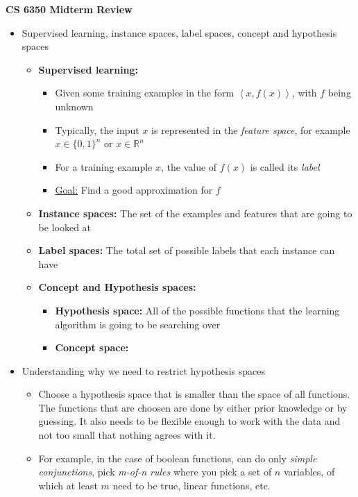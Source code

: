 \documentclass{article}
\begin{document}
\begin{center}
{\huge \bf CS 6350 Midterm Review}
\end{center}


\hspace{-1.5em}{\large \bf General Supervised Learning}
\begin{itemize}
\item Supervised learning, instance spaces, label spaces, concept and hypothesis spaces
	\begin{itemize}
	\item {\bf Supervised learning:} 
		\begin{itemize}
		\item Given some training examples in the form $\left< x,f(x)\right>$, with $f$ being unknown
		\item Typically, the input $x$ is represented in the {\em feature space}, for example $x\in \{0,1\}^{n}\text{ or }x\in \mathbb{R}^{n}$
		\item For a training example $x$, the value of $f(x)$ is called its {\em label}
		\item \underline{Goal:} Find a good approximation for $f$
		\end{itemize}
	\item {\bf Instance spaces:} The set of the examples and features that are going to be looked at
	\item {\bf Label spaces:} The total set of possible labels that each instance can have
	\item {\bf Concept and Hypothesis spaces:}
		\begin{itemize}
		\item {\bf Hypothesis space:} All of the possible functions that the learning algorithm is going to be searching over
		\item {\bf Concept space:} 
		\end{itemize}
	\end{itemize}
\item Understanding why we need to restrict hypothesis spaces
	\begin{itemize}
	\item Choose a hypothesis space that is smaller than the space of all functions. The functions that are choosen are done by either prior knowledge or by guessing. It also needs to be flexible enough to work with the data and not too small that nothing agrees with it.
	\item For example, in the case of boolean functions, can do only {\em simple conjunctions}, pick {\em m-of-n rules} where you pick a set of $n$ variables, of which at least $m$ need to be true, linear functions, etc.

\end{itemize}
\end{itemize}
\end{document}
